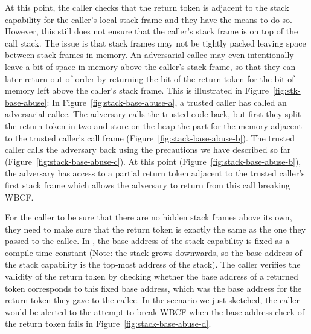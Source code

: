 \documentclass{jfp}
\begin{document}
At this point, the caller checks that the return token is adjacent to the stack capability for the caller's local stack frame and they have the means to do so.
However, this still does not ensure that the caller's stack frame is on top of the call stack.
The issue is that stack frames may not be tightly packed leaving space between stack frames in memory.
An adversarial callee may even intentionally leave a bit of space in memory above the caller's stack frame, so that they can later return out of order by returning the bit of the return token for the bit of memory left above the caller's stack frame.
This is illustrated in Figure~\ref{fig:stk-base-abuse}: In Figure~\ref{fig:stack-base-abuse-a}, a trusted caller has called an adversarial callee.
The adversary calls the trusted code back, but first they split the return token in two and store on the heap the part for the memory adjacent to the trusted caller's call frame (Figure~\ref{fig:stack-base-abuse-b}).
The trusted caller calls the adversary back using the precautions we have described so far (Figure~\ref{fig:stack-base-abuse-c}).
At this point (Figure~\ref{fig:stack-base-abuse-b}), the adversary has access to a partial return token adjacent to the trusted caller's first stack frame which allows the adversary to return from this call breaking WBCF.

For the caller to be sure that there are no hidden stack frames above its own, they need to make sure that the return token is exactly the same as the one they passed to the callee.
In \stktokens{}, the base address of the stack capability is fixed as a compile-time constant (Note: the stack grows downwards, so the base address of the stack capability is the top-most address of the stack). 
The caller verifies the validity of the return token by checking whether the base address of a returned token corresponds to this fixed base address, which was the base address for the return token they gave to the callee.
In the scenario we just sketched, the caller would be alerted to the attempt to break WBCF when the base address check of the return token fails in Figure~\ref{fig:stack-base-abuse-d}.
\end{document}
